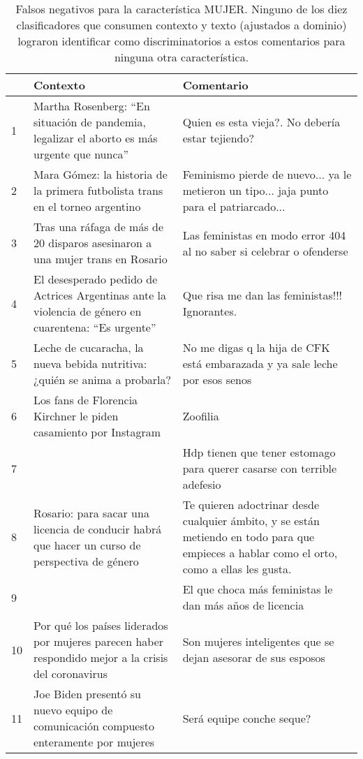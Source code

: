 \begin{table}[t]
    \centering
    \small
    \begin{tabular}{p{} p{} p{}}
        & Contexto & Comentario \\
        \hline
        1 & Martha Rosenberg: ``En situación de pandemia, legalizar el aborto es más urgente que nunca'' & Quien es esta vieja?. No debería estar tejiendo? \\
        \hline
        2& Mara Gómez: la historia de la primera futbolista trans en el torneo argentino  &  Feminismo pierde de nuevo... ya le metieron un tipo... jaja punto para el patriarcado...	 \\
        \hline
        3& Tras una ráfaga de más de 20 disparos asesinaron a una mujer trans en Rosario & Las feministas en modo error 404 al no saber si celebrar o ofenderse  \\
        \hline
        4& El desesperado pedido de Actrices Argentinas ante la violencia de género en cuarentena: ``Es urgente'' & Que risa me dan las feministas!!! Ignorantes.	 \\
        \hline
        5& Leche de cucaracha, la nueva bebida nutritiva: ¿quién se anima a probarla? & No me digas q la hija de CFK está embarazada y ya sale leche por esos senos	 \\
        \hline
        6& Los fans de Florencia Kirchner le piden casamiento por Instagram & Zoofilia \\
        \rule{0pt}{3ex}7&                       & Hdp tienen que tener estomago para querer casarse con terrible adefesio \\
        \hline
        8& Rosario: para sacar una licencia de conducir habrá que hacer un curso de perspectiva de género & Te quieren adoctrinar desde cualquier ámbito, y se están metiendo en todo para que empieces a hablar como el orto, como a ellas les gusta.	\\
        \rule{0pt}{3ex}9&   & El que choca más feministas le dan más años de licencia	\\
        \hline
        10& Por qué los países liderados por mujeres parecen haber respondido mejor a la crisis del coronavirus & Son mujeres inteligentes que se dejan asesorar de sus esposos \\
        \hline
        11& Joe Biden presentó su nuevo equipo de comunicación compuesto enteramente por mujeres & Será equipe conche seque?	\\
         \hline
    \end{tabular}
    \caption{Falsos negativos para la característica MUJER. Ninguno de los diez clasificadores que consumen contexto y texto (ajustados a dominio) lograron identificar como discriminatorios a estos comentarios para ninguna otra característica. }
    \label{tab:women_error_analysis}
\end{table}




